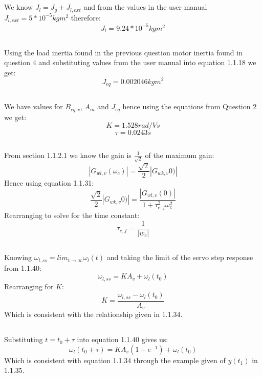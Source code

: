   \subsection{} We know $ J_{l} = J_{g} + J_{l,ext} $ and from the values in the user
  manual \cite{user_manual} $ J_{l,ext} = 5 * 10^{-5} kg m^{2} $ therefore:
  $$ J_{l} = 9.24*10^{-5} kg m^{2}$$
  \subsection{} Using the load inertia found in the previous question motor inertia found in
  question 4 and substituting values from the user manual \cite{user_manual}
  into equation 1.1.18 we get:
  $$ J_{eq} = 0.002046 kg m^{2}$$
  \subsection{} We have values for $ B_{eq,v}$, $A_{m}$ and $J_{eq}$ hence using the
  equations from Question 2 we get:
  $$ K = 1.528 rad/Vs $$
  $$ \tau = 0.0243 s $$
  \subsection{} From section 1.1.2.1 we know the gain is $\frac{1}{\sqrt{2}}$ of the maximum gain:
  $$ |G_{wl,v}(\omega_{c})| = \frac{\sqrt{2}}{2}|G_{wk,v}0)| $$
  Hence using equation 1.1.31:
  $$\frac{\sqrt{2}}{2}|G_{wk,v}0)| = \frac{|G_{wl,v}(0)|}{1+\tau_{e,f}^{2}\omega_{c}^{2}}$$
  Rearranging to solve for the time constant:
  $$ \tau_{e,f} = \frac{1}{|w_{c}|} $$
  \subsection{} Knowing $\omega_{l,ss} = lim_{t\to\infty}\omega_{l}(t)$ and taking the limit of the
  servo step response from 1.1.40:
  $$\omega_{l,ss} = KA_{v} + \omega_{l}(t_{0})$$
  Rearranging for $K$:
  $$ K = \frac{\omega_{l,ss}-\omega_{l}(t_{0})}{A_{v}} $$
  Which is consistent with the relationship given in 1.1.34.
  \subsection{} Substituting $ t = t_{0} + \tau$ into equation 1.1.40 gives us:
  $$ \omega_{l}(t_{0} + \tau) = KA_{v}(1-e^{-1})+ \omega_{l}(t_{0})$$
  Which is consistent with equation 1.1.34 through the example given of
  $y(t_{1})$ in 1.1.35.
